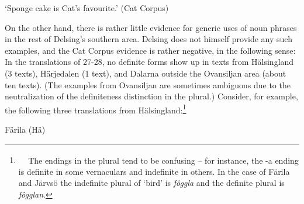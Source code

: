 \begin{styleTranslation}
‘Sponge cake is Cat’s favourite.’ (Cat Corpus)

\end{styleTranslation}

\begin{styleBodyTextFirst}
On the other hand, there is rather little evidence for generic uses of noun phrases in the rest of Delsing’s southern area. Delsing does not himself provide any such examples, and the Cat Corpus evidence is rather negative, in the following sense: In the translations of 27{}-28, no definite forms show up in texts from Hälsingland (3 texts), Härjedalen (1 text), and Dalarna outside the Ovansiljan area (about ten texts). (The examples from Ovansiljan are sometimes ambiguous due to the neutralization of the definiteness distinction in the plural.) Consider, for example, the following three translations from Hälsingland:\footnote{\textsuperscript{\ \ } The endings in the plural tend to be confusing – for instance, the -a ending is definite in some vernaculars and indefinite in others. In the case of Färila and Järvsö the indefinite plural of ‘bird’ is \textit{fôggla} and the definite plural is \textit{fôgglan}. }

\end{styleBodyTextFirst}


\begin{listWWNumileveli}
\item 

\end{listWWNumileveli}

\begin{listWWNumxxleveli}
\item 

\begin{styleExLtrTbl}
Färila (Hä)

\end{styleExLtrTbl}

\end{listWWNumxxleveli}

